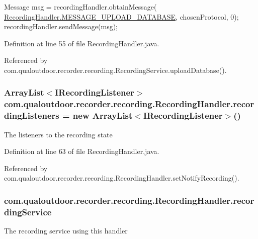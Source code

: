 \begin{DoxyCode}
Message msg = recordingHandler.obtainMessage(
         \hyperlink{classcom_1_1qualoutdoor_1_1recorder_1_1recording_1_1RecordingHandler_a4a893d8da4a4d1f0811ca8b3fe5a1793}{RecordingHandler.MESSAGE\_UPLOAD\_DATABASE}, chosenProtocol, 
      0);
recordingHandler.sendMessage(msg);
\end{DoxyCode}
 

Definition at line 55 of file Recording\-Handler.\-java.



Referenced by com.\-qualoutdoor.\-recorder.\-recording.\-Recording\-Service.\-upload\-Database().

\hypertarget{classcom_1_1qualoutdoor_1_1recorder_1_1recording_1_1RecordingHandler_a4fa68c1a53c3c122b41ef26bbac86fb0}{
\subsubsection[{recording\-Listeners}]{\setlength{\rightskip}{0pt plus 5cm}Array\-List$<${\bf I\-Recording\-Listener}$>$ com.\-qualoutdoor.\-recorder.\-recording.\-Recording\-Handler.\-recording\-Listeners = new Array\-List$<${\bf I\-Recording\-Listener}$>$()\hspace{0.3cm}{\ttfamily [private]}}}\label{classcom_1_1qualoutdoor_1_1recorder_1_1recording_1_1RecordingHandler_a4fa68c1a53c3c122b41ef26bbac86fb0}
The listeners to the recording state 

Definition at line 63 of file Recording\-Handler.\-java.



Referenced by com.\-qualoutdoor.\-recorder.\-recording.\-Recording\-Handler.\-set\-Notify\-Recording().

\hypertarget{classcom_1_1qualoutdoor_1_1recorder_1_1recording_1_1RecordingHandler_a0fd9f14da8697f982103fdde7a6478f6}{
\subsubsection[{recording\-Service}]{ com.\-qualoutdoor.\-recorder.\-recording.\-Recording\-Handler.\-recording\-Service\hspace{0.3cm}{\ttfamily [private]}}}\label{classcom_1_1qualoutdoor_1_1recorder_1_1recording_1_1RecordingHandler_a0fd9f14da8697f982103fdde7a6478f6}
The recording service using this handler 

